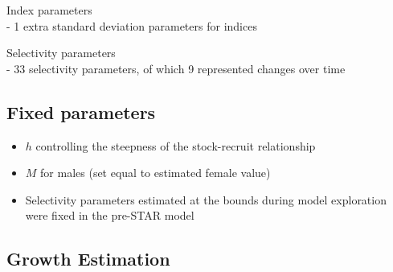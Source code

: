 \documentclass[11pt,
  english,
  a4paper,
]{article}
\begin{document}
Index parameters\\
- 1 extra standard deviation parameters for indices

Selectivity parameters\\
- 33 selectivity parameters, of which 9 represented changes over time


\hypertarget{fixed-parameters}{%
\subsection{Fixed parameters}\label{fixed-parameters}}

\leavevmode\tagmcend\tagstructend


\begin{itemize}
\item

  {\(h\)\leavevmode\tagmcend\tagstructend} controlling the steepness of the stock-recruit relationship

  \tagmcend\tagstructend\tagstructend
\item

  {\(M\)\leavevmode\tagmcend\tagstructend} for males (set equal to estimated female value)

  \tagmcend\tagstructend\tagstructend
\item

  Selectivity parameters estimated at the bounds during model exploration were fixed in the pre-STAR model

  \tagmcend\tagstructend\tagstructend
\end{itemize}

\tagstructend


\hypertarget{growth-estimation}{%
\subsection{Growth Estimation}\label{growth-estimation}}

\leavevmode\tagmcend\tagstructend
\end{document}
